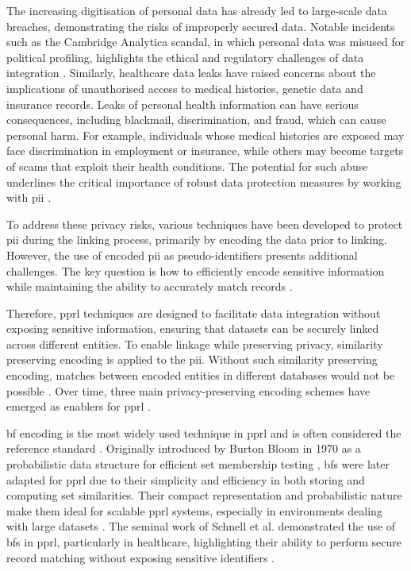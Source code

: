 The increasing digitisation of personal data has already led to large-scale data breaches, demonstrating the risks of improperly secured data.
Notable incidents such as the Cambridge Analytica scandal, in which personal data was misused for political profiling, highlights the ethical and regulatory challenges of data integration \cite{isaak2018user}.
Similarly, healthcare data leaks have raised concerns about the implications of unauthorised access to medical histories, genetic data and insurance records.
Leaks of personal health information can have serious consequences, including blackmail, discrimination, and fraud, which can cause personal harm.
For example, individuals whose medical histories are exposed may face discrimination in employment or insurance, while others may become targets of scams that exploit their health conditions.
The potential for such abuse underlines the critical importance of robust data protection measures by working with \ac{pii} \cite{smith2016examining}.

To address these privacy risks, various techniques have been developed to protect \ac{pii} during the linking process, primarily by encoding the data prior to linking.
However, the use of encoded \ac{pii} as pseudo-identifiers presents additional challenges.
The key question is how to efficiently encode sensitive information while maintaining the ability to accurately match records \cite{schnell2009privacy}.

Therefore, \ac{pprl} techniques are designed to facilitate data integration without exposing sensitive information, ensuring that datasets can be securely linked across different entities.
To enable linkage while preserving privacy, similarity preserving encoding is applied to the \ac{pii}.
Without such similarity preserving encoding, matches between encoded entities in different databases would not be possible \cite{schnell2009privacy, vatsalan2017privacy}.
Over time, three main privacy-preserving encoding schemes have emerged as enablers for \ac{pprl} \cite{vidanage2020graph, schaefer2024}.

\ac{bf} encoding is the most widely used technique in \ac{pprl} and is often considered the reference standard \cite{schaefer2024}.
Originally introduced by Burton Bloom in 1970 as a probabilistic data structure for efficient set membership testing \cite{bloom1970space}, \ac{bf}s were later adapted for \ac{pprl} due to their simplicity and efficiency in both storing and computing set similarities.
Their compact representation and probabilistic nature make them ideal for scalable \ac{pprl} systems, especially in environments dealing with large datasets \cite{schnell2009privacy}.
The seminal work of Schnell et al. \cite{schnell2009privacy} demonstrated the use of \ac{bf}s in \ac{pprl}, particularly in healthcare, highlighting their ability to perform secure record matching without exposing sensitive identifiers \cite{schnell2009privacy}.

